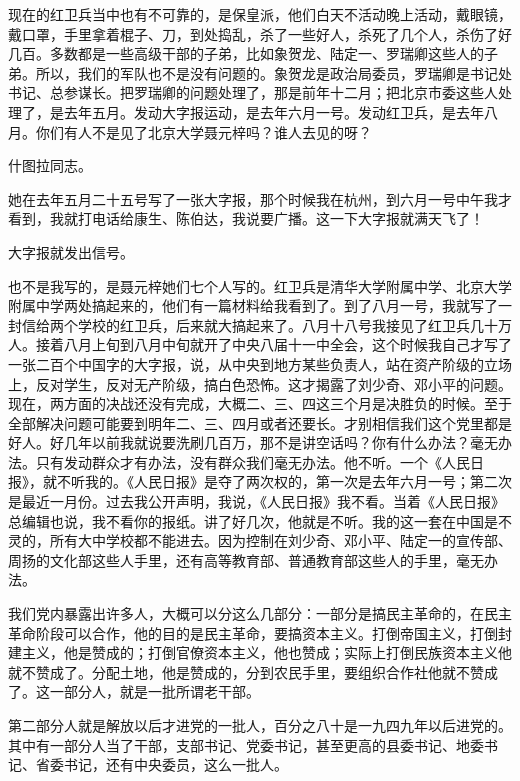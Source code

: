 现在的红卫兵当中也有不可靠的，是保皇派，他们白天不活动晚上活动，戴眼镜，戴口罩，手里拿着棍子、刀，到处捣乱，杀了一些好人，杀死了几个人，杀伤了好几百。多数都是一些高级干部的子弟，比如象贺龙、陆定一、罗瑞卿这些人的子弟。所以，我们的军队也不是没有问题的。象贺龙是政治局委员，罗瑞卿是书记处书记、总参谋长。把罗瑞卿的问题处理了，那是前年十二月；把北京市委这些人处理了，是去年五月。发动大字报运动，是去年六月一号。发动红卫兵，是去年八月。你们有人不是见了北京大学聂元梓吗？谁人去见的呀？

什图拉同志。

她在去年五月二十五号写了一张大字报，那个时候我在杭州，到六月一号中午我才看到，我就打电话给康生、陈伯达，我说要广播。这一下大字报就满天飞了！

大字报就发出信号。

也不是我写的，是聂元梓她们七个人写的。红卫兵是清华大学附属中学、北京大学附属中学两处搞起来的，他们有一篇材料给我看到了。到了八月一号，我就写了一封信给两个学校的红卫兵，后来就大搞起来了。八月十八号我接见了红卫兵几十万人。接着八月上旬到八月中旬就开了中央八届十一中全会，这个时候我自己才写了一张二百个中国字的大字报，说，从中央到地方某些负责人，站在资产阶级的立场上，反对学生，反对无产阶级，搞白色恐怖。这才揭露了刘少奇、邓小平的问题。现在，两方面的决战还没有完成，大概二、三、四这三个月是决胜负的时候。至于全部解决问题可能要到明年二、三、四月或者还要长。才别相信我们这个党里都是好人。好几年以前我就说要洗刷几百万，那不是讲空话吗？你有什么办法？毫无办法。只有发动群众才有办法，没有群众我们毫无办法。他不听。一个《人民日报》，就不听我的。《人民日报》是夺了两次权的，第一次是去年六月一号；第二次是最近一月份。过去我公开声明，我说，《人民日报》我不看。当着《人民日报》总编辑也说，我不看你的报纸。讲了好几次，他就是不听。我的这一套在中国是不灵的，所有大中学校都不能进去。因为控制在刘少奇、邓小平、陆定一的宣传部、周扬的文化部这些人手里，还有高等教育部、普通教育部这些人的手里，毫无办法。

我们党内暴露出许多人，大概可以分这么几部分：一部分是搞民主革命的，在民主革命阶段可以合作，他的目的是民主革命，要搞资本主义。打倒帝国主义，打倒封建主义，他是赞成的；打倒官僚资本主义，他也赞成；实际上打倒民族资本主义他就不赞成了。分配土地，他是赞成的，分到农民手里，要组织合作社他就不赞成了。这一部分人，就是一批所谓老干部。

第二部分人就是解放以后才进党的一批人，百分之八十是一九四九年以后进党的。其中有一部分人当了干部，支部书记、党委书记，甚至更高的县委书记、地委书记、省委书记，还有中央委员，这么一批人。


